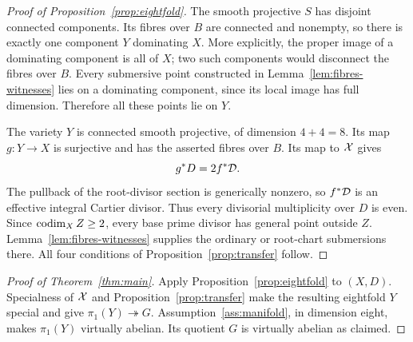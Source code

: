 \begin{proof}[Proof of Proposition~\ref{prop:eightfold}]
The smooth projective $S$ has disjoint connected components. Its fibres over $B$ are connected and nonempty, so there is exactly one component $Y$ dominating $X$. More explicitly, the proper image of a dominating component is all of $X$; two such components would disconnect the fibres over $B$. Every submersive point constructed in Lemma~\ref{lem:fibres-witnesses} lies on a dominating component, since its local image has full dimension. Therefore all these points lie on $Y$.

The variety $Y$ is connected smooth projective, of dimension $4+4=8$. Its map $g:Y\to X$ is surjective and has the asserted fibres over $B$. Its map to $\mathcal X$ gives
\[
 g^*D=2f^*\mathcal D.
\]
The pullback of the root-divisor section is generically nonzero, so $f^*\mathcal D$ is an effective integral Cartier divisor. Thus every divisorial multiplicity over $D$ is even. Since $\operatorname{codim}_X Z\ge2$, every base prime divisor has general point outside $Z$. Lemma~\ref{lem:fibres-witnesses} supplies the ordinary or root-chart submersions there. All four conditions of Proposition~\ref{prop:transfer} follow.
\end{proof}

\begin{proof}[Proof of Theorem~\ref{thm:main}]
Apply Proposition~\ref{prop:eightfold} to $(X,D)$. Specialness of $\mathcal X$ and Proposition~\ref{prop:transfer} make the resulting eightfold $Y$ special and give $\pi_1(Y)\twoheadrightarrow G$. Assumption~\ref{ass:manifold}, in dimension eight, makes $\pi_1(Y)$ virtually abelian. Its quotient $G$ is virtually abelian as claimed.
\end{proof}
